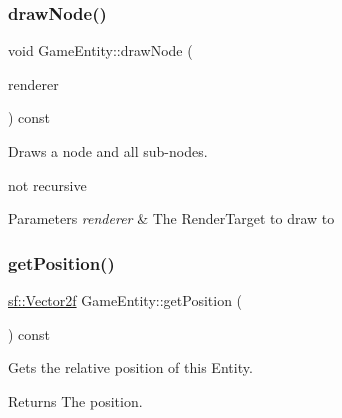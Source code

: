 \mbox{\label{class_game_entity_ae272a1dab8caaeec31ba7b12cf237c57}} 
\subsubsection{\texorpdfstring{drawNode()}{drawNode()}}
{\footnotesize\ttfamily void Game\+Entity\+::draw\+Node (\begin{DoxyParamCaption}\item[{\mbox{\hyperlink{classsf_1_1_render_target}{sf\+::\+Render\+Target}} \&}]{renderer }\end{DoxyParamCaption}) const\hspace{0.3cm}{\ttfamily [inline]}}



Draws a node and all sub-\/nodes. 

not recursive


\begin{DoxyParams}{Parameters}
{\em renderer} & The Render\+Target to draw to \\
\hline
\end{DoxyParams}
\mbox{\label{class_game_entity_a8456643412ae833a5ce9d1988fa66e72}} 
\subsubsection{\texorpdfstring{getPosition()}{getPosition()}}
{\footnotesize\ttfamily \mbox{\hyperlink{classsf_1_1_vector2}{sf\+::\+Vector2f}} Game\+Entity\+::get\+Position (\begin{DoxyParamCaption}{ }\end{DoxyParamCaption}) const\hspace{0.3cm}{\ttfamily [inline]}}



Gets the relative position of this Entity. 

\begin{DoxyReturn}{Returns}
The position. 
\end{DoxyReturn}
\mbox{\label{class_game_entity_a567bab0fe1e2c3dd98fa031d2e5df14e}} 
